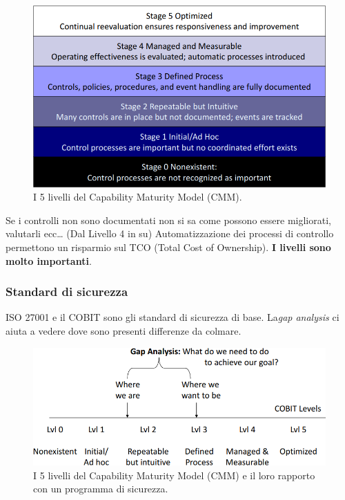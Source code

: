 \begin{figure}[h!]
        \begin{center}
                \includegraphics[scale=2.0]{res/img/maturity_level}
        \end{center}
        \caption{I 5 livelli del Capability Maturity Model (CMM).}
        \label{fig:cmm:levels}
\end{figure}

Se i controlli non sono documentati non si sa come possono essere migliorati, 
valutarli ecc\dots
(Dal Livello 4 in su) Automatizzazione dei processi di controllo permettono un 
risparmio sul TCO (Total Cost of Ownership).
\textbf{I livelli sono molto importanti}.


\subsubsection{Standard di sicurezza}

ISO 27001 e il COBIT sono gli standard di sicurezza di base. La\textit{gap 
analysis} ci aiuta a vedere dove sono presenti differenze da colmare.

\begin{figure}[h!]
        \begin{center}
                \includegraphics[scale=2.0]{res/img/security_standard}
        \end{center}
        \caption{I 5 livelli del Capability Maturity Model (CMM) e il
        loro rapporto con un programma di sicurezza.}
        \label{fig:}
\end{figure}


